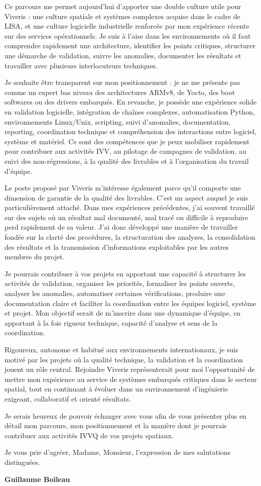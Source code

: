 \documentclass[11pt,a4paper]{../_shared/altacv}
\begin{document}
{Ce parcours me permet aujourd'hui d'apporter une double culture utile pour Viveris : une culture spatiale et systèmes complexes acquise dans le cadre de LISA, et une culture logicielle industrielle renforcée par mon expérience récente sur des services opérationnels. Je suis à l'aise dans les environnements où il faut comprendre rapidement une architecture, identifier les points critiques, structurer une démarche de validation, suivre les anomalies, documenter les résultats et travailler avec plusieurs interlocuteurs techniques.

Je souhaite être transparent sur mon positionnement : je ne me présente pas comme un expert bas niveau des architectures ARMv8, de Yocto, des boot softwares ou des drivers embarqués. En revanche, je possède une expérience solide en validation logicielle, intégration de chaînes complexes, automatisation Python, environnements Linux/Unix, scripting, suivi d'anomalies, documentation, reporting, coordination technique et compréhension des interactions entre logiciel, système et matériel. Ce sont des compétences que je peux mobiliser rapidement pour contribuer aux activités IVV, au pilotage de campagnes de validation, au suivi des non-régressions, à la qualité des livrables et à l'organisation du travail d'équipe.

Le poste proposé par Viveris m'intéresse également parce qu'il comporte une dimension de garantie de la qualité des livrables. C'est un aspect auquel je suis particulièrement attaché. Dans mes expériences précédentes, j'ai souvent travaillé sur des sujets où un résultat mal documenté, mal tracé ou difficile à reproduire perd rapidement de sa valeur. J'ai donc développé une manière de travailler fondée sur la clarté des procédures, la structuration des analyses, la consolidation des résultats et la transmission d'informations exploitables par les autres membres du projet.

Je pourrais contribuer à vos projets en apportant une capacité à structurer les activités de validation, organiser les priorités, formaliser les points ouverts, analyser les anomalies, automatiser certaines vérifications, produire une documentation claire et faciliter la coordination entre les équipes logiciel, système et projet. Mon objectif serait de m'inscrire dans une dynamique d'équipe, en apportant à la fois rigueur technique, capacité d'analyse et sens de la coordination.

Rigoureux, autonome et habitué aux environnements internationaux, je suis motivé par les projets où la qualité technique, la validation et la coordination jouent un rôle central. Rejoindre Viveris représenterait pour moi l'opportunité de mettre mon expérience au service de systèmes embarqués critiques dans le secteur spatial, tout en continuant à évoluer dans un environnement d'ingénierie exigeant, collaboratif et orienté résultats.

Je serais heureux de pouvoir échanger avec vous afin de vous présenter plus en détail mon parcours, mon positionnement et la manière dont je pourrais contribuer aux activités IVVQ de vos projets spatiaux.

Je vous prie d'agréer, Madame, Monsieur, l'expression de mes salutations distinguées.

\textbf{Guillaume Boileau}

}
\end{document}
